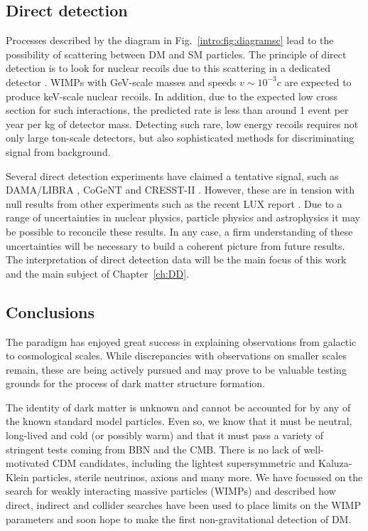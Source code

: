 
\subsection{Direct detection}

Processes described by the diagram in Fig.~\ref{intro:fig:diagramsc} lead to the possibility of scattering between DM and SM particles. The principle of direct detection is to look for nuclear recoils due to this scattering in a dedicated detector \cite{Goodman:1985,Drukier:1986}. WIMPs with GeV-scale masses and speeds $v \sim 10^{-3} c$ are expected to produce keV-scale nuclear recoils. In addition, due to the expected low cross section for such interactions, the predicted rate is less than around 1 event per year per kg of detector mass. Detecting such rare, low energy recoils requires not only large ton-scale detectors, but also sophisticated methods for discriminating signal from background.

Several direct detection experiments have claimed a tentative signal, such as DAMA/LIBRA \cite{Bernabei:2010}, CoGeNT \cite{Aalseth:2011a, Aalseth:2011b} and CRESST-II \cite{Stodolsky:2012}. However, these are in tension with null results from other experiments such as the recent LUX report \cite{Akerib:2014}. Due to a range of uncertainties in nuclear physics, particle physics and astrophysics it may be possible to reconcile these results. In any case, a firm understanding of these uncertainties will be necessary to build a coherent picture from future results. The interpretation of direct detection data will be the main focus of this work and the main subject of Chapter~\ref{ch:DD}.


\subsection{Conclusions}

The \LCDM paradigm has enjoyed great success in explaining observations from galactic to cosmological scales. While discrepancies with observations on smaller scales remain, these are being actively pursued and may prove to be valuable testing grounds for the process of dark matter structure formation.

The identity of dark matter is unknown and cannot be accounted for by any of the known standard model particles. Even so, we know that it must be neutral, long-lived and cold (or possibly warm) and that it must pass a variety of stringent tests coming from BBN and the CMB. There is no lack of well-motivated CDM candidates, including the lightest supersymmetric and Kaluza-Klein particles, sterile neutrinos, axions and many more. We have focussed on the search for weakly interacting massive particles (WIMPs) and described how direct, indirect and collider searches have been used to place limits on the WIMP parameters and soon hope to make the first non-gravitational detection of DM.
